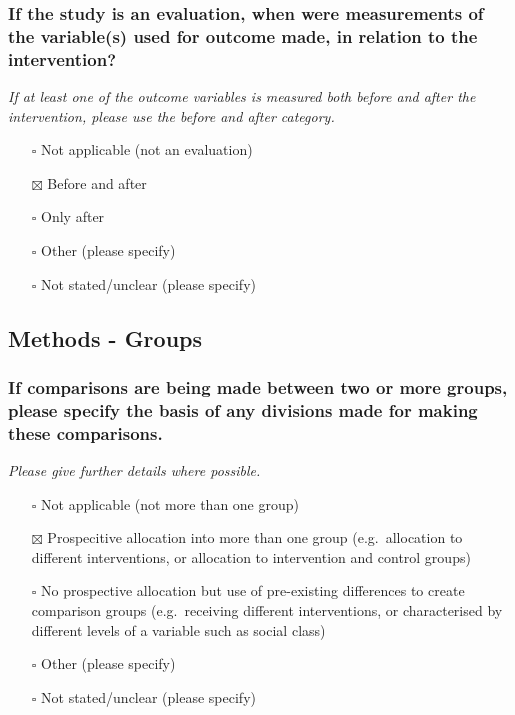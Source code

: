 \documentclass[
  doc, a4paper]{apa7}
\providecommand{\tightlist}{%
  \setlength{\itemsep}{0pt}\setlength{\parskip}{0pt}}
\begin{document}
\subsubsection{If the study is an evaluation, when were measurements of the variable(s) used for outcome made, in relation to the intervention?}\label{if-the-study-is-an-evaluation-when-were-measurements-of-the-variables-used-for-outcome-made-in-relation-to-the-intervention}

\emph{If at least one of the outcome variables is measured both before and after the intervention, please use the before and after category.}

\begin{itemize}
\tightlist
\item[$\square$]
  Not applicable (not an evaluation)\\
\item[$\boxtimes$]
  Before and after\\
\item[$\square$]
  Only after\\
\item[$\square$]
  Other (please specify)\\
\item[$\square$]
  Not stated/unclear (please specify)
\end{itemize}

\subsection{Methods - Groups}\label{methods---groups}

\subsubsection{If comparisons are being made between two or more groups, please specify the basis of any divisions made for making these comparisons.}\label{if-comparisons-are-being-made-between-two-or-more-groups-please-specify-the-basis-of-any-divisions-made-for-making-these-comparisons.}

\emph{Please give further details where possible.}

\begin{itemize}
\tightlist
\item[$\square$]
  Not applicable (not more than one group)\\
\item[$\boxtimes$]
  Prospecitive allocation into more than one group (e.g.~allocation to different interventions, or allocation to intervention and control groups)\\
\item[$\square$]
  No prospective allocation but use of pre-existing differences to create comparison groups (e.g.~receiving different interventions, or characterised by different levels of a variable such as social class)\\
\item[$\square$]
  Other (please specify)\\
\item[$\square$]
  Not stated/unclear (please specify)
\end{itemize}
\end{document}
